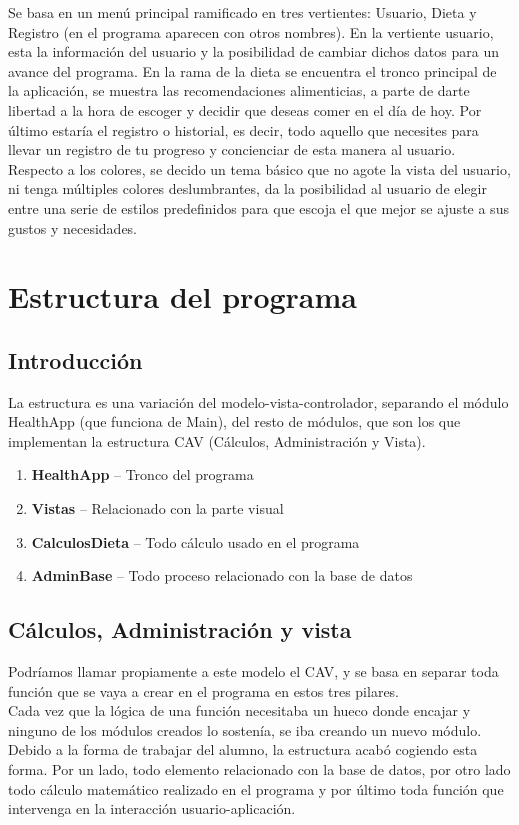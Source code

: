 Se basa en un menú principal ramificado en tres vertientes: Usuario, Dieta y Registro (en el programa aparecen con otros nombres). En la vertiente usuario, esta la información del usuario y la posibilidad de cambiar dichos datos para un avance del programa. En la rama de la dieta se encuentra el tronco principal de la aplicación, se muestra las recomendaciones alimenticias, a parte de darte libertad a la hora de escoger y decidir que deseas comer en el día de hoy. Por último estaría el registro o historial, es decir, todo aquello que necesites para llevar un registro de tu progreso y concienciar de esta manera al usuario.\\

Respecto a los colores, se decido un tema básico que no agote la vista del usuario, ni tenga múltiples colores deslumbrantes, da la posibilidad al usuario de elegir entre una serie de estilos predefinidos para que escoja el que mejor se ajuste a sus gustos y necesidades.\\
\section{Estructura del programa}
\subsection{Introducción}

La estructura es una variación del modelo-vista-controlador, separando el módulo HealthApp (que funciona de Main), del resto de módulos, que son los que implementan la estructura CAV (Cálculos, Administración y Vista).
\begin{enumerate}
\item	\textbf{HealthApp} – Tronco del programa
\item	\textbf{Vistas} – Relacionado con la parte visual
\item	\textbf{CalculosDieta} – Todo cálculo usado en el programa
\item	\textbf{AdminBase} – Todo proceso relacionado con la base de datos

\end{enumerate}

\subsection{Cálculos, Administración y vista}
Podríamos llamar propiamente a este modelo el CAV, y se basa en separar toda función que se vaya a crear en el programa en estos tres pilares. \\
Cada vez que la lógica de una función necesitaba un hueco donde encajar y ninguno de los módulos creados lo sostenía, se iba creando un nuevo módulo. Debido a la forma de trabajar del alumno, la estructura acabó cogiendo esta forma.  Por un lado, todo elemento relacionado con la base de datos, por otro lado todo cálculo matemático realizado en el programa y por último toda función que intervenga en la interacción usuario-aplicación.\\


